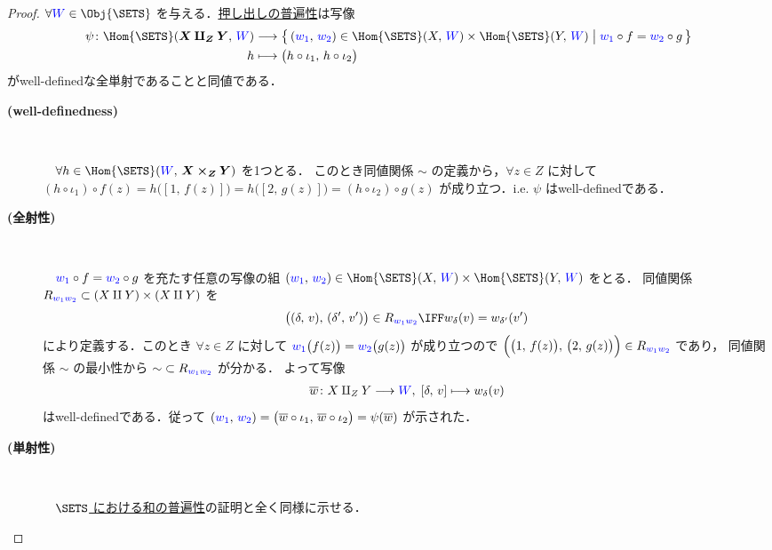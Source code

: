\documentclass[geometry_main]{subfiles}
\begin{document}
\begin{proof}
	$\forall \textcolor{blue}{W} \in \Obj{\SETS}$ を与える．\hyperref[cmtd:pushout]{押し出しの普遍性}は写像
	\begin{align}
		\psi \colon \Hom{\SETS} (\bm{X \amalg_Z Y},\, \textcolor{blue}{W}) &\lto \bigl\{\, (\textcolor{blue}{w_1},\, \textcolor{blue}{w_2}) \in \Hom{\SETS}(X,\, \textcolor{blue}{W}) \times \Hom{\SETS}(Y,\, \textcolor{blue}{W}) \bigm| \textcolor{blue}{w_1} \circ f = \textcolor{blue}{w_2} \circ g \,\bigr\} \\
		h &\lmto \bigl( h \circ \iota_1,\, h \circ \iota_2\bigr) 
	\end{align}
	がwell-definedな全単射であることと同値である．
	\begin{description}
		\item[\textbf{(well-definedness)}] 　
		
		　$\forall h \in \Hom{\SETS} (\textcolor{blue}{W},\, \bm{X \times_Z Y})$ を1つとる．
		このとき同値関係 $\sim$ の定義から，$\forall z \in Z$ に対して
		$(h \circ \iota_1) \circ f(z) = h\bigl([1,\, f(z)]\bigr) = h \bigl( [2,\, g(z)] \bigr) = (h \circ \iota_2) \circ g(z)$
		が成り立つ．i.e. $\psi$ はwell-definedである．

		\item[\textbf{(全射性)}] 　
		
		　$\textcolor{blue}{w_1} \circ f = \textcolor{blue}{w_2} \circ g$ を充たす任意の写像の組 $(\textcolor{blue}{w_1},\, \textcolor{blue}{w_2}) \in \Hom{\SETS}(X,\, \textcolor{blue}{W}) \times \Hom{\SETS}(Y,\, \textcolor{blue}{W})$ をとる．
		同値関係 $R_{\textcolor{blue}{w_1w_2}} \subset (X \amalg Y) \times (X \amalg Y)$ を
		\begin{align}
			\bigl((\delta,\, v),\, (\delta',\, v')\bigr) \in R_{\textcolor{blue}{w_1w_2}} \IFF w_\delta(v) = w_{\delta'} (v')
		\end{align}
		により定義する．このとき $\forall z \in Z$ に対して $\textcolor{blue}{w_1} \bigl( f(z) \bigr) = \textcolor{blue}{w_2} \bigl( g(z) \bigr)$ が成り立つので $\Bigl( \bigl( 1,\, f(z) \bigr),\, \bigl( 2,\, g(z) \bigr) \Bigr) \in R_{\textcolor{blue}{w_1} \textcolor{blue}{w_2}}$ であり，
		同値関係 ${\sim}$ の最小性から $\sim\; \subset R_{\textcolor{blue}{w_1} \textcolor{blue}{w_2}}$ が分かる．
		よって写像
		\begin{align}
			\overline{w} \colon X \amalg_Z Y \longrightarrow \textcolor{blue}{W},\; [\delta,\, v] \longmapsto w_{\delta}(v)
		\end{align}
		はwell-definedである．従って $(\textcolor{blue}{w_1},\, \textcolor{blue}{w_2}) = \bigl( \overline{w} \circ \iota_1,\, \overline{w} \circ \iota_2 \bigr) = \psi(\overline{w})$ が示された．

		\item[\textbf{(単射性)}] 　
		
		　\hyperref[prop:sum-sets]{$\SETS$ における和の普遍性}の証明と全く同様に示せる．
	\end{description}
\end{proof}
\end{document}
